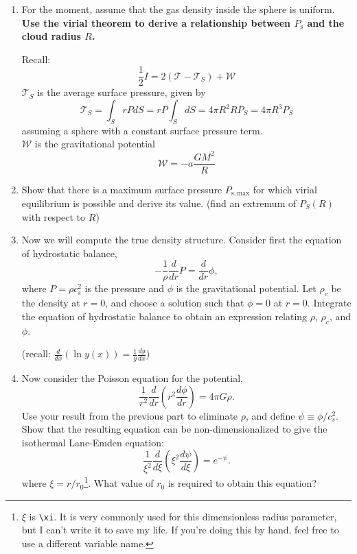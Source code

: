\documentclass{article}
\begin{document}
\begin{enumerate}
\item For the moment, assume that the gas density inside the sphere is uniform.
    \textbf{Use the virial theorem to derive a relationship between $P_{\mathrm{s}}$
    and the cloud radius $R$. }

    Recall:
    $$\frac{1}{2}\ddot{I} = 2 (\mathcal{T} - \mathcal{T}_S) + \mathcal{W}$$
    $\mathcal{T}_S$ is the average surface pressure, given by
    $$\mathcal{T}_S = \int_S r P dS = r P \int_S dS = 4 \pi R^2 R P_S = 4 \pi R^3 P_S$$
    assuming a sphere with a constant surface pressure term. \\
    $\mathcal{W}$ is the gravitational potential
    $$\mathcal{W} = - a \frac{GM^2}{R}$$

\item Show that there is a maximum surface pressure $P_{\mathrm{s,max}}$ for
    which virial equilibrium is possible and derive its value.
    (find an extremum of $P_S(R)$ with respect to $R$)


\item Now we will compute the true density structure. Consider first the equation of hydrostatic balance,
\begin{displaymath}
-\frac{1}{\rho}\frac{d}{dr} P = \frac{d}{dr} \phi,
\end{displaymath}
where $P = \rho c_s^2$ is the pressure and $\phi$ is the gravitational
potential. Let $\rho_c$ be the density at $r=0$, and choose a solution such that
$\phi = 0$ at $r=0$. Integrate the equation of hydrostatic balance to obtain an
expression relating $\rho$, $\rho_c$, and $\phi$.

(recall: $\frac{d }{dx}\left(\ln y(x)\right) = \frac{1}{y} \frac{d y}{dx}$)

\item Now consider the Poisson equation for the potential,
\begin{displaymath}
\frac{1}{r^2}\frac{d}{dr}\left(r^2 \frac{d\phi}{dr}\right) = 4 \pi G \rho.
\end{displaymath}
Use your result from the previous part to eliminate $\rho$, and define $\psi \equiv \phi/c_s^2$. Show that the resulting equation can be non-dimensionalized to give the isothermal Lane-Emden equation:
\begin{displaymath}
\frac{1}{\xi^2}\frac{d}{d\xi}\left(\xi^2 \frac{d\psi}{d\xi}\right) = e^{-\psi}.
\end{displaymath}
where $\xi = r/r_0$\footnote{$\xi$ is \texttt{\textbackslash xi}.  It is very commonly used
for this dimensionless radius parameter, but I can't write it to save my life.
If you're doing this by hand, feel free to use a different variable name.}.
What value of $r_0$ is required to obtain this equation?
\label{item:r0}



\end{enumerate}
\end{document}
